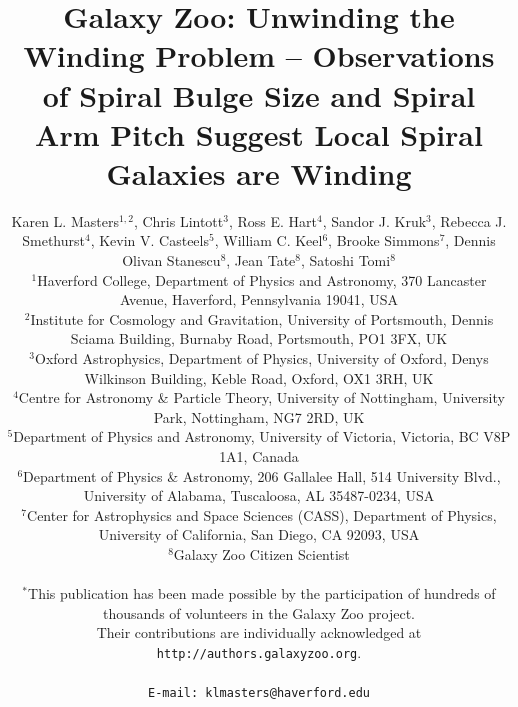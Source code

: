 \documentclass[usenatbib]{mn2e}
\newcommand{\etal}{{\it et al.}}
\begin{document}
\title[Galaxy Zoo: Unwinding the Winding Problem]{Galaxy Zoo: Unwinding the Winding Problem -- Observations of Spiral Bulge Size and Spiral Arm Pitch Suggest Local Spiral Galaxies are Winding}
\author[K.L. Masters \etal]{Karen L. Masters$^{1,2}$, Chris Lintott$^{3}$, Ross E. Hart$^{4}$, Sandor J. Kruk$^{3}$, \newauthor Rebecca J. Smethurst$^{4}$,  Kevin V. Casteels$^5$, William C. Keel$^6$, Brooke Simmons$^7$, \newauthor Dennis Olivan Stanescu$^8$, Jean Tate$^8$, Satoshi Tomi$^8$\\ %
$^1$Haverford College, Department of Physics and Astronomy, 370 Lancaster Avenue, Haverford, Pennsylvania 19041, USA\\
$^2$Institute for Cosmology and Gravitation, University of Portsmouth, Dennis Sciama Building, Burnaby Road, Portsmouth, PO1 3FX, UK \\
 $^{3}$Oxford Astrophysics, Department of Physics, University of Oxford, Denys Wilkinson Building, Keble Road, Oxford, OX1 3RH, UK\\
 $^4$Centre for Astronomy \& Particle Theory, University of Nottingham, University Park, Nottingham, NG7 2RD, UK\\
 $^5$Department of Physics and Astronomy, University of Victoria, Victoria, BC V8P 1A1, Canada\\
 $^6$Department of Physics \& Astronomy, 206 Gallalee Hall, 514 University Blvd., University of Alabama, Tuscaloosa, AL 35487-0234, USA\\
 $^7$Center for Astrophysics and Space Sciences (CASS), Department of Physics, University of California, San Diego, CA 92093, USA\\
 $^8$Galaxy Zoo Citizen Scientist\\
\\
 $^*$This publication has been made possible by the participation of hundreds of thousands of volunteers in the Galaxy Zoo project. \\ Their contributions are individually acknowledged at \texttt{http://authors.galaxyzoo.org}. \\
\\
{\tt E-mail: klmasters@haverford.edu}
 }

 
\end{document}
